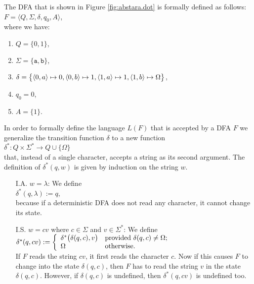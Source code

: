 \exampleEng
The \textsc{DFA} that is shown in Figure  \ref{fig:abstara.dot} is formally defined as follows:
\\[0.2cm]
\hspace*{1.3cm}
$F = \langle Q, \Sigma, \delta, q_0, A \rangle$,
\\[0.2cm]
where we have:
\begin{enumerate}
\item $Q = \{ 0, 1 \}$,
\item $\Sigma = \{ \texttt{a}, \texttt{b} \}$,
\item $\delta = \bigl\{ 
                        \pair(0,a) \mapsto 0, 
                        \pair(0,b) \mapsto 1, 
                        \pair(1,a) \mapsto 1, 
                        \pair(1,b) \mapsto \Omega 
                \bigr\}$,
\item $q_0 = 0$,
\item $A = \{ 1 \}$.
\end{enumerate}
In order to formally define the language $L(F)$ that is accepted by a \textsc{DFA} $F$
we generalize the transition function $\delta$ to a new function
\\[0.2cm]
\hspace*{1.3cm}
$\delta^*: Q \times \Sigma^* \rightarrow Q \cup \{ \Omega \}$
\\[0.2cm]
that, instead of a single character, accepts a string as its second argument.  The definition of
$\delta^*(q, w)$ is given by induction on the string $w$.
\begin{enumerate}
\item[I.A.] $w = \lambda$:  We define
            \\[0.2cm]
            \hspace*{1.3cm}
            $\delta^*(q, \lambda) := q$,
            \\[0.2cm]
            because if a deterministic \textsc{DFA} does not read any character, it cannot change its state. 
\item[I.S.] $w = cv$ where $c \in \Sigma$ and $v  \in \Sigma^*$:  We define
            \\[0.2cm]
            \hspace*{1.3cm}
            $\delta^*(q, cv) := \left\{
            \begin{array}[c]{ll}              
            \delta^*\bigl(\delta(q,c),v\bigr) & \mbox{provided $\delta(q,c) \not= \Omega$;} \\
            \Omega                            & \mbox{otherwise}.
            \end{array}
            \right.
            $
            \\[0.2cm]
            If $F$ reads the string  $cv$, it first reads the character $c$.  Now if this causes  $F$
            to change into the state $\delta(q,c)$, then $F$ has to read the string $v$ in the state
            $\delta(q,c)$.  However, 
            if  $\delta(q,c)$ is undefined, then  $\delta^*(q,cv)$ is undefined too.
\end{enumerate}

